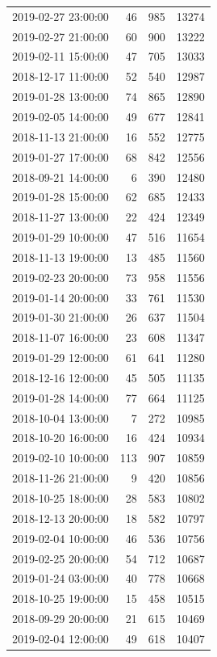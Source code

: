 \begin{tabular}{lrrr}
2019-02-27 23:00:00 & 46 & 985 & 13274 \\
2019-02-27 21:00:00 & 60 & 900 & 13222 \\
2019-02-11 15:00:00 & 47 & 705 & 13033 \\
2018-12-17 11:00:00 & 52 & 540 & 12987 \\
2019-01-28 13:00:00 & 74 & 865 & 12890 \\
2019-02-05 14:00:00 & 49 & 677 & 12841 \\
2018-11-13 21:00:00 & 16 & 552 & 12775 \\
2019-01-27 17:00:00 & 68 & 842 & 12556 \\
2018-09-21 14:00:00 & 6 & 390 & 12480 \\
2019-01-28 15:00:00 & 62 & 685 & 12433 \\
2018-11-27 13:00:00 & 22 & 424 & 12349 \\
2019-01-29 10:00:00 & 47 & 516 & 11654 \\
2018-11-13 19:00:00 & 13 & 485 & 11560 \\
2019-02-23 20:00:00 & 73 & 958 & 11556 \\
2019-01-14 20:00:00 & 33 & 761 & 11530 \\
2019-01-30 21:00:00 & 26 & 637 & 11504 \\
2018-11-07 16:00:00 & 23 & 608 & 11347 \\
2019-01-29 12:00:00 & 61 & 641 & 11280 \\
2018-12-16 12:00:00 & 45 & 505 & 11135 \\
2019-01-28 14:00:00 & 77 & 664 & 11125 \\
2018-10-04 13:00:00 & 7 & 272 & 10985 \\
2018-10-20 16:00:00 & 16 & 424 & 10934 \\
2019-02-10 10:00:00 & 113 & 907 & 10859 \\
2018-11-26 21:00:00 & 9 & 420 & 10856 \\
2018-10-25 18:00:00 & 28 & 583 & 10802 \\
2018-12-13 20:00:00 & 18 & 582 & 10797 \\
2019-02-04 10:00:00 & 46 & 536 & 10756 \\
2019-02-25 20:00:00 & 54 & 712 & 10687 \\
2019-01-24 03:00:00 & 40 & 778 & 10668 \\
2018-10-25 19:00:00 & 15 & 458 & 10515 \\
2018-09-29 20:00:00 & 21 & 615 & 10469 \\
2019-02-04 12:00:00 & 49 & 618 & 10407 \\

\end{tabular}
